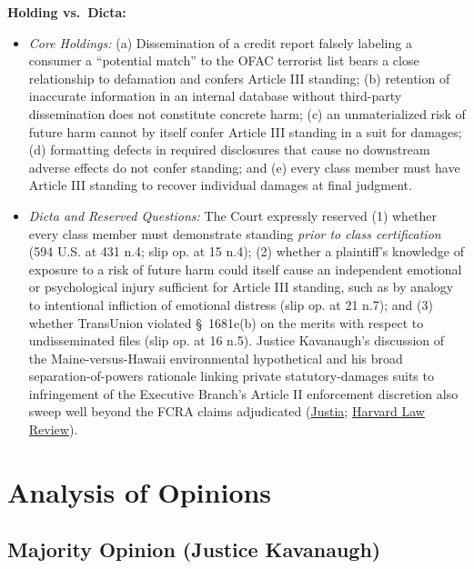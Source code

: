 \documentclass[12pt]{article}
\begin{document}
\textbf{Holding vs.\ Dicta:}
\begin{itemize}
\item \textit{Core Holdings:} (a) Dissemination of a credit report falsely labeling a consumer a ``potential match'' to the OFAC terrorist list bears a close relationship to defamation and confers Article III standing; (b) retention of inaccurate information in an internal database without third-party dissemination does not constitute concrete harm; (c) an unmaterialized risk of future harm cannot by itself confer Article III standing in a suit for damages; (d) formatting defects in required disclosures that cause no downstream adverse effects do not confer standing; and (e) every class member must have Article III standing to recover individual damages at final judgment.
\item \textit{Dicta and Reserved Questions:} The Court expressly reserved (1) whether every class member must demonstrate standing \textit{prior to class certification} (594 U.S. at 431 n.4; slip op. at 15 n.4); (2) whether a plaintiff's knowledge of exposure to a risk of future harm could itself cause an independent emotional or psychological injury sufficient for Article III standing, such as by analogy to intentional infliction of emotional distress (slip op. at 21 n.7); and (3) whether TransUnion violated \S~1681e(b) on the merits with respect to undisseminated files (slip op. at 16 n.5). Justice Kavanaugh's discussion of the Maine-versus-Hawaii environmental hypothetical and his broad separation-of-powers rationale linking private statutory-damages suits to infringement of the Executive Branch's Article II enforcement discretion also sweep well beyond the FCRA claims adjudicated (\href{https://supreme.justia.com/cases/federal/us/594/20-297/}{Justia}; \href{https://harvardlawreview.org/print/vol-135/transunion-v-ramirez/}{Harvard Law Review}).
\end{itemize}

\section{Analysis of Opinions}

\subsection{Majority Opinion (Justice Kavanaugh)}
\end{document}
